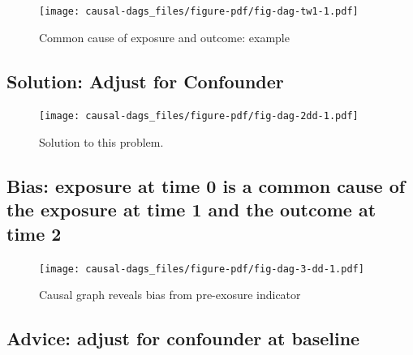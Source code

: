 \documentclass[
  singlecolumn]{report}
\begin{document}
\begin{figure}

{\centering \texttt{[image: causal-dags\_files/figure-pdf/fig-dag-tw1-1.pdf]}

}

\caption{\label{fig-dag-tw1}Common cause of exposure and outcome:
example}

\end{figure}

\hypertarget{solution-adjust-for-confounder}{%
\subsection{Solution: Adjust for
Confounder}\label{solution-adjust-for-confounder}}

\begin{figure}

{\centering \texttt{[image: causal-dags\_files/figure-pdf/fig-dag-2dd-1.pdf]}

}

\caption{\label{fig-dag-2dd}Solution to this problem.}

\end{figure}

\hypertarget{bias-exposure-at-time-0-is-a-common-cause-of-the-exposure-at-time-1-and-the-outcome-at-time-2}{%
\subsection{Bias: exposure at time 0 is a common cause of the exposure
at time 1 and the outcome at time
2}\label{bias-exposure-at-time-0-is-a-common-cause-of-the-exposure-at-time-1-and-the-outcome-at-time-2}}

\begin{figure}

{\centering \texttt{[image: causal-dags\_files/figure-pdf/fig-dag-3-dd-1.pdf]}

}

\caption{\label{fig-dag-3-dd}Causal graph reveals bias from pre-exosure
indicator}

\end{figure}

\hypertarget{advice-adjust-for-confounder-at-baseline}{%
\subsection{Advice: adjust for confounder at
baseline}\label{advice-adjust-for-confounder-at-baseline}}
\end{document}
